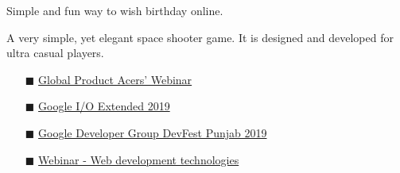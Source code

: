  {Simple and fun way to wish birthday online.}


    { A very simple, yet elegant space shooter game. It is designed and developed for ultra casual players. } 

    

\begin{itemize}
    \item [$\blacksquare$] \href{https://www.linkedin.com/video/event/urn:li:ugcPost:6914574200020094976/}   {Global Product Acers' Webinar }
      \item [$\blacksquare$] \href{https://www.linkedin.com/posts/sarthak-jain24apr98_io19extended-google-io-activity-6542084758430674944-dDkg }   {Google I/O Extended 2019 }
    \item [$\blacksquare$] \href{https://www.linkedin.com/posts/sarthak-jain24apr98_devfest-googledevelopergroups-womentechmakers-activity-6588625422014091264-Pbc-/} {Google Developer Group DevFest Punjab 2019}
     
     \item [$\blacksquare$] \href{https://www.youtube.com/watch?v=6RS0q9Oih2E&feature=youtu.be&t=368 } {Webinar - Web development technologies}
   
    
    
    \end{itemize}

  
 \newline 
 
 \newline 


 \newline

